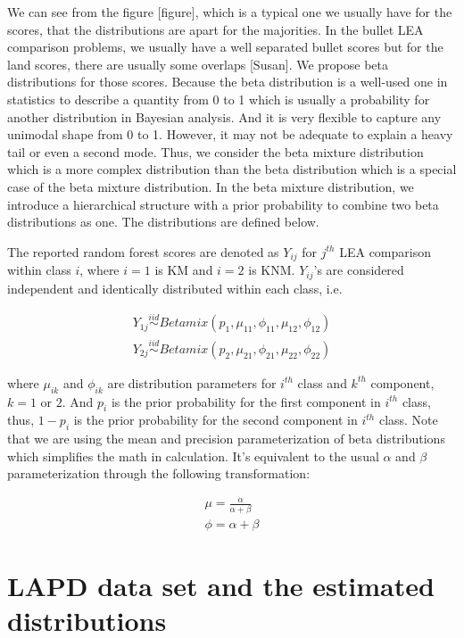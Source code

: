 \documentclass[]{elsarticle} %
\begin{document}
We can see from the figure {[}figure{]}, which is a typical one we
usually have for the scores, that the distributions are apart for the
majorities. In the bullet LEA comparison problems, we usually have a
well separated bullet scores but for the land scores, there are usually
some overlaps {[}Susan{]}. We propose beta distributions for those
scores. Because the beta distribution is a well-used one in statistics
to describe a quantity from 0 to 1 which is usually a probability for
another distribution in Bayesian analysis. And it is very flexible to
capture any unimodal shape from 0 to 1. However, it may not be adequate
to explain a heavy tail or even a second mode. Thus, we consider the
beta mixture distribution which is a more complex distribution than the
beta distribution which is a special case of the beta mixture
distribution. In the beta mixture distribution, we introduce a
hierarchical structure with a prior probability to combine two beta
distributions as one. The distributions are defined below.

The reported random forest scores are denoted as \(Y_{ij}\) for
\(j^{th}\) LEA comparison within class \(i\), where \(i = 1\) is KM and
\(i = 2\) is KNM. \(Y_{ij}\)'s are considered independent and
identically distributed within each class, i.e.

\begin{align*}
Y_{1j} \stackrel{iid}{\sim}  Betamix(p_1, \mu_{11}, \phi_{11}, \mu_{12}, \phi_{12})\\
Y_{2j} \stackrel{iid}{\sim}  Betamix(p_2, \mu_{21}, \phi_{21}, \mu_{22}, \phi_{22})
\end{align*}

where \(\mu_{ik}\) and \(\phi_{ik}\) are distribution parameters for
\(i^{th}\) class and \(k^{th}\) component, \(k = 1\) or \(2\). And
\(p_i\) is the prior probability for the first component in \(i^{th}\)
class, thus, \(1-p_i\) is the prior probability for the second component
in \(i^{th}\) class. Note that we are using the mean and precision
parameterization of beta distributions which simplifies the math in
calculation. It's equivalent to the usual \(\alpha\) and \(\beta\)
parameterization through the following transformation:

\begin{align*}
\mu = \frac{\alpha}{\alpha+\beta} \\
\phi = \alpha + \beta
\end{align*}

\hypertarget{lapd-data-set-and-the-estimated-distributions}{%
\section{LAPD data set and the estimated
distributions}\label{lapd-data-set-and-the-estimated-distributions}}
\end{document}
